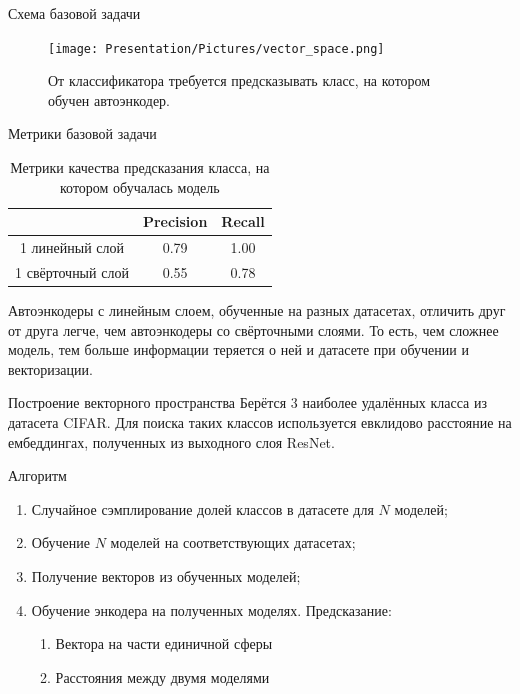 \documentclass{beamer}
\begin{document}
\begin{frame}{Схема базовой задачи}
\begin{figure}
    \texttt{[image: Presentation/Pictures/vector\_space.png]}
    \caption{От классификатора требуется предсказывать класс, на котором обучен автоэнкодер.}
\end{figure}
\end{frame}
\begin{frame}{Метрики базовой задачи}
\begin{table}[!ht]
\begin{center}
\caption{Метрики качества предсказания класса, на котором обучалась модель}
\begin{tabular}{| c | c | c |}
\hline
& Precision & Recall \\ \hline
1 линейный слой & 0.79 & 1.00 \\ \hline
1 свёрточный слой & 0.55 & 0.78 \\ \hline
\end{tabular}
\end{center}
\end{table}

Автоэнкодеры с линейным слоем, обученные на разных датасетах, отличить друг от друга легче, чем автоэнкодеры со свёрточными слоями. То есть, чем сложнее модель, тем больше информации теряется о ней и датасете при обучении и векторизации.
\end{frame}
\begin{frame}{Построение векторного пространства}
Берётся 3 наиболее удалённых класса из датасета CIFAR. Для поиска таких классов используется евклидово расстояние на ембеддингах, полученных из выходного слоя ResNet.

\begin{block}{Алгоритм}
\begin{enumerate}
    \item Случайное сэмплирование долей классов в датасете для $N$ моделей;

    \item Обучение $N$ моделей на соответствующих датасетах;

    \item Получение векторов из обученных моделей;

    \item Обучение энкодера на полученных моделях. Предсказание:
        \begin{enumerate}
            \item Вектора на части единичной сферы

            \item Расстояния между двумя моделями
        \end{enumerate}
\end{enumerate}
\end{block}
\end{frame}
\end{document}
